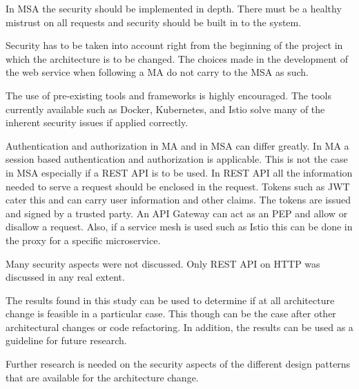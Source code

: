 \begin{sloppypar}
    In MSA the security should be implemented in depth. There must be a healthy
    mistrust on all requests and security should be built in to the system.
\end{sloppypar}
\begin{sloppypar}
    Security has to be taken into account right from the beginning of the
    project in which the architecture is to be changed. The choices made in the
    development of the web service when following a MA do not carry to the MSA
    as such.
\end{sloppypar}
\begin{sloppypar}
    The use of pre-existing tools and frameworks is highly encouraged. The tools
    currently available such as Docker, Kubernetes, and Istio solve many of the
    inherent security issues if applied correctly.
\end{sloppypar}
\begin{sloppypar}
    Authentication and authorization in MA and in MSA can differ greatly. In MA
    a session based authentication and authorization is applicable. This is not
    the case in MSA especially if a REST API is to be used. In REST API all the
    information needed to serve a request should be enclosed in the request.
    Tokens such as JWT cater this and can carry user information and other
    claims. The tokens are issued and signed by a trusted party. An API Gateway
    can act as an PEP and allow or disallow a request. Also, if a service mesh
    is used such as Istio this can be done in the proxy for a specific
    microservice.
\end{sloppypar}
\begin{sloppypar}
    Many security aspects were not discussed. Only REST API on HTTP was
    discussed in any real extent. 
\end{sloppypar}
\begin{sloppypar}
    The results found in this study can be used to determine if at all
    architecture change is feasible in a particular case. This though can be the
    case after other architectural changes or code refactoring. In addition, the
    results can be used as a guideline for future research.
\end{sloppypar}
\begin{sloppypar}
    Further research is needed on the security aspects of the different design
    patterns that are available for the architecture change.
\end{sloppypar}
